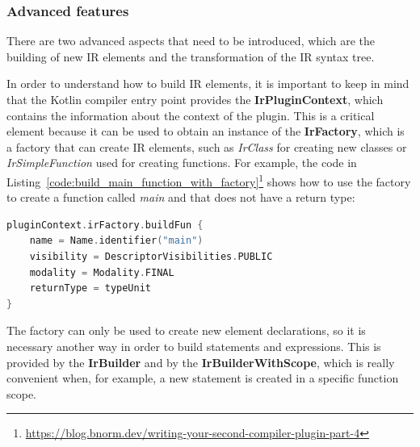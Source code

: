 \subsubsection{Advanced features}\label{section:compiler_plugin_advaced}
There are two advanced aspects that need to be introduced, which are the building of new IR elements and the transformation of the IR syntax tree.

In order to understand how to build IR elements, it is important to keep in mind that the Kotlin compiler entry point provides the \textbf{IrPluginContext}, which contains the information about the context of the plugin. This is a critical element because it can be used to obtain an instance of the \textbf{IrFactory}, which is a factory that can create IR elements, such as \textit{IrClass} for creating new classes or \textit{IrSimpleFunction} used for creating functions.\newline
For example, the code in Listing~\ref{code:build_main_function_with_factory}\footnote{\url{https://blog.bnorm.dev/writing-your-second-compiler-plugin-part-4}} shows how to use the factory to create a function called \textit{main} and that does not have a return type:
\begin{lstlisting}[caption={Main function IR building by using the IrFactory}, captionpos=b, language=Kotlin, label={code:build_main_function_with_factory}]
pluginContext.irFactory.buildFun {
    name = Name.identifier("main")
    visibility = DescriptorVisibilities.PUBLIC
    modality = Modality.FINAL
    returnType = typeUnit
}        
\end{lstlisting}

The factory can only be used to create new element declarations, so it is necessary another way in order to build statements and expressions. This is provided by the \textbf{IrBuilder} and by the \textbf{IrBuilderWithScope}, which is really convenient when, for example, a new statement is created in a specific function scope.

